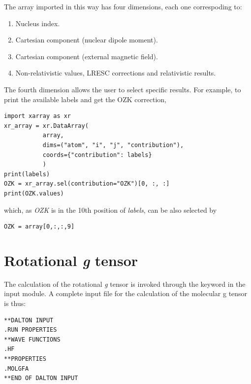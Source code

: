 The array imported in this way has four dimensions, each one correspoding to:
\begin{enumerate}%
 \item Nucleus index.
 \item Cartesian component (nuclear dipole moment).
 \item Cartesian component (external magnetic field).
 \item Non-relativistic values, LRESC corrections and relativistic results.
\end{enumerate}

The fourth dimension allows the user to select specific results. For example, to print the available labels and get the OZK correction,
\begin{lstlisting}
import xarray as xr
xr_array = xr.DataArray(
           array,
           dims=("atom", "i", "j", "contribution"),
           coords={"contribution": labels}
           )
print(labels)
OZK = xr_array.sel(contribution="OZK")[0, :, :]
print(OZK.values)
\end{lstlisting}
which, as \textit{OZK} is in the 10th position of \textit{labels}, can be also selected by
\begin{lstlisting}
OZK = array[0,:,:,9]
\end{lstlisting}


\section{Rotational {\em g} tensor}\label{sec:gfac}

\begin{center}
\end{center}

The calculation of the rotational  {\em g} tensor is invoked through the
keyword  in the  input module. A complete
input file for the calculation of the molecular g tensor is thus:

\begin{verbatim}
**DALTON INPUT
.RUN PROPERTIES
**WAVE FUNCTIONS
.HF
**PROPERTIES
.MOLGFA
**END OF DALTON INPUT
\end{verbatim}

